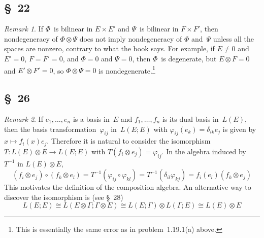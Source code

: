 \documentclass[letterpaper,12pt]{article}
\newcommand{\iso}{\cong}
\newcommand{\after}{\circ}
\newcommand{\tprod}{\otimes}
\theoremstyle{definition}
\theoremstyle{remark}
\newtheorem*{rmk}{Remark}
\begin{document}
\subsection*{\S~22}
\begin{rmk}
If \(\Phi\)~is bilinear in \(E\times E'\) and \(\Psi\)~is bilinear in \(F\times F'\), then nondegeneracy of \(\Phi\tprod\Psi\) does not imply nondegeneracy of \(\Phi\) and~\(\Psi\) unless all the spaces are nonzero, contrary to what the book says. For example, if \(E\ne 0\) and \(E'=0\), \(F=F'=0\), and \(\Phi=0\) and \(\Psi=0\), then \(\Phi\)~is degenerate, but \(E\tprod F=0\) and \(E'\tprod F'=0\), so \(\Phi\tprod\Psi=0\) is nondegenerate.\footnote{This is essentially the same error as in problem~1.19.1(a) above.}
\end{rmk}

\subsection*{\S~26}
\begin{rmk}
If \(e_1,\ldots,e_n\) is a basis in~\(E\) and \(f_1,\ldots,f_n\) is its dual basis in~\(L(E)\), then the basis transformation~\(\varphi_{ij}\) in~\(L(E;E)\) with \(\varphi_{ij}(e_k)=\delta_{ik}e_j\) is given by \(x\mapsto f_i(x)e_j\). Therefore it is natural to consider the isomorphism \(T:L(E)\tprod E\to L(E;E)\) with \(T(f_i\tprod e_j)=\varphi_{ij}\). In the algebra induced by~\(T^{-1}\) in \(L(E)\tprod E\),
\[(f_i\tprod e_j)\after(f_k\tprod e_l)=T^{-1}(\varphi_{ij}\after\varphi_{kl})=T^{-1}(\delta_{il}\varphi_{kj})=f_i(e_l)(f_k\tprod e_j)\]
This motivates the definition of the composition algebra. An alternative way to discover the isomorphism is (see \S~28)
\[L(E;E)\iso L(E\tprod\Gamma;\Gamma\tprod E)\iso L(E;\Gamma)\tprod L(\Gamma;E)\iso L(E)\tprod E\]
\end{rmk}
\end{document}
